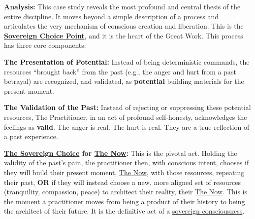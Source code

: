 \documentclass{article}
\begin{document}
\begin{nobullet}
\begin{nobullet}
        \item \textbf{Analysis:} This case study reveals the most profound and central thesis of the entire discipline. It moves beyond a simple description of a process and articulates the very mechanism of conscious creation and liberation. This is the \textbf{\hyperlink{gloss:sovereign_choice_point}{Sovereign Choice Point}}, and it is the heart of the Great Work. This process has three core components:
    
            \begin{nobullet}
                \item \textbf{The Presentation of Potential:} Instead of being deterministic commands, the resources ``brought back'' from the past (e.g., the anger and hurt from a past betrayal) are recognized, and validated, as \textbf{potential} building materials for the present moment.
                
                \item \textbf{The Validation of the Past:} Instead of rejecting or suppressing these potential resources, The Practitioner, in an act of profound self-honesty, acknowledges the feelings as \textbf{valid}. The anger is real. The hurt is real. They are a true reflection of a past experience.
                
                \item \textbf{\hyperlink{gloss:sovereign_choice}{The Sovereign Choice} for \hyperlink{gloss:the_now}{The Now}:} This is the pivotal act. Holding the validity of the past's pain, the practitioner then, with conscious intent, chooses if they will build their present moment, \hyperlink{gloss:the_now}{The Now}, with those resources, repeating their past, \textbf{OR} if they will instead choose a new, more aligned set of resources (tranquility, compassion, peace) to architect their reality, their \hyperlink{gloss:the_now}{The Now}. This is the moment a practitioner moves from being a product of their history to being the architect of their future. It is the definitive act of a \hyperlink{gloss:sovereign_consciousness}{sovereign consciousness}.
            \end{nobullet}
        \end{nobullet}


\end{nobullet}
\end{document}
